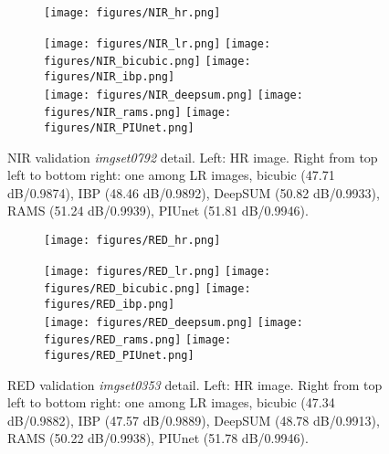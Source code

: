 \documentclass[journal]{IEEEtran}
\begin{document}
\begin{figure*}[ht]
    \centering
    \begin{subfigure}[b]{0.39\textwidth}
    \texttt{[image: figures/NIR\_hr.png]}
    \end{subfigure}
    \begin{subfigure}[b]{0.6\textwidth}
    \texttt{[image: figures/NIR\_lr.png]}
    \texttt{[image: figures/NIR\_bicubic.png]}
    \texttt{[image: figures/NIR\_ibp.png]}\\[2pt]
    \texttt{[image: figures/NIR\_deepsum.png]}
    \texttt{[image: figures/NIR\_rams.png]}
    \texttt{[image: figures/NIR\_PIUnet.png]}
    \end{subfigure}
    \caption{NIR validation \textit{imgset0792} detail. Left: HR image. Right from top left to bottom right: one among LR images, bicubic (47.71 dB/0.9874), IBP (48.46 dB/0.9892), DeepSUM (50.82 dB/0.9933), RAMS (51.24 dB/0.9939), PIUnet (51.81 dB/0.9946).}
    \label{fig:nir_qualitative}
\end{figure*}


\begin{figure*}[ht]
    \centering
    \begin{subfigure}[b]{0.39\textwidth}
    \texttt{[image: figures/RED\_hr.png]}
    \end{subfigure}
    \begin{subfigure}[b]{0.6\textwidth}
    \texttt{[image: figures/RED\_lr.png]}
    \texttt{[image: figures/RED\_bicubic.png]}
    \texttt{[image: figures/RED\_ibp.png]}\\[2pt]
    \texttt{[image: figures/RED\_deepsum.png]}
    \texttt{[image: figures/RED\_rams.png]}
    \texttt{[image: figures/RED\_PIUnet.png]}
    \end{subfigure}
    \caption{RED validation \textit{imgset0353} detail. Left: HR image. Right from top left to bottom right: one among LR images, bicubic (47.34 dB/0.9882), IBP (47.57 dB/0.9889), DeepSUM (48.78 dB/0.9913), RAMS (50.22 dB/0.9938), PIUnet (51.78 dB/0.9946).}
    \label{fig:red_qualitative}
\end{figure*}
\end{document}

